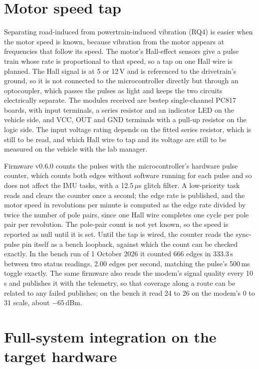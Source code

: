 \section{Motor speed tap}
\label{sec:hall-tap}

Separating road-induced from powertrain-induced vibration (RQ4) is easier when the motor speed is known, because vibration from the motor appears at frequencies that follow its speed. The motor's Hall-effect sensors give a pulse train whose rate is proportional to that speed, so a tap on one Hall wire is planned. The Hall signal is at 5 or 12\,V and is referenced to the drivetrain's ground, so it is not connected to the microcontroller directly but through an optocoupler, which passes the pulses as light and keeps the two circuits electrically separate. The modules received are bestep single-channel PC817 boards, with input terminals, a series resistor and an indicator LED on the vehicle side, and VCC, OUT and GND terminals with a pull-up resistor on the logic side. The input voltage rating depends on the fitted series resistor, which is still to be read, and which Hall wire to tap and its voltage are still to be measured on the vehicle with the lab manager.

Firmware v0.6.0 counts the pulses with the microcontroller's hardware pulse counter, which counts both edges without software running for each pulse and so does not affect the IMU tasks, with a 12.5\,$\mu$s glitch filter. A low-priority task reads and clears the counter once a second; the edge rate is published, and the motor speed in revolutions per minute is computed as the edge rate divided by twice the number of pole pairs, since one Hall wire completes one cycle per pole pair per revolution. The pole-pair count is not yet known, so the speed is reported as null until it is set. Until the tap is wired, the counter reads the sync-pulse pin itself as a bench loopback, against which the count can be checked exactly. In the bench run of 1 October 2026 it counted 666 edges in 333.3\,s between two status readings, 2.00 edges per second, matching the pulse's 500\,ms toggle exactly. The same firmware also reads the modem's signal quality every 10\,s and publishes it with the telemetry, so that coverage along a route can be related to any failed publishes; on the bench it read 24 to 26 on the modem's 0 to 31 scale, about $-65$\,dBm.

\section{Full-system integration on the target hardware}
\label{sec:full-system-integration}

